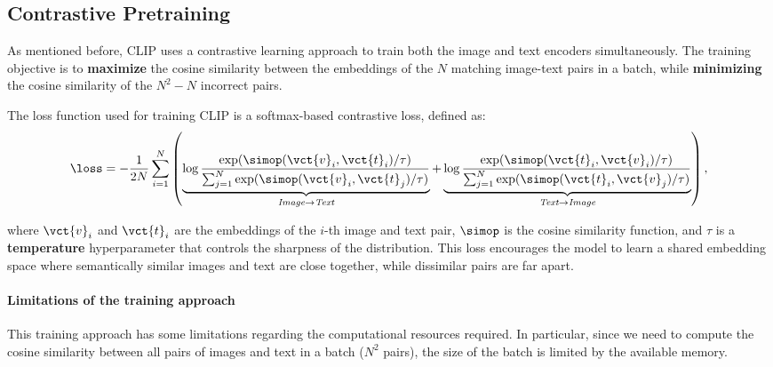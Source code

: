 \subsection{Contrastive Pretraining}
As mentioned before, CLIP uses a contrastive learning approach to train both the image and text encoders simultaneously.
The training objective is to \textbf{maximize} the cosine similarity between the embeddings of the $N$ matching 
image-text pairs in a batch, while \textbf{minimizing} the cosine similarity of the $N^2 - N$ incorrect pairs.

The loss function used for training CLIP is a softmax-based contrastive loss, defined as:
\begin{equation}
    \loss = -\frac{1}{2N} \sum_{i=1}^{N} \left(
    \underbrace{\log \frac{\exp(\simop(\vct{v}_i, \vct{t}_i) / \tau)}{\sum_{j=1}^{N} \exp(\simop(\vct{v}_i, \vct{t}_j) / \tau)}}_{\textit{Image} \to \textit{Text}}
    +
    \underbrace{\log \frac{\exp(\simop(\vct{t}_i, \vct{v}_i) / \tau)}{\sum_{j=1}^{N} \exp(\simop(\vct{t}_i, \vct{v}_j) / \tau)}}_{\textit{Text} \to \textit{Image}}\right),
\end{equation}

where $\vct{v}_i$ and $\vct{t}_i$ are the embeddings of the $i$-th image and text pair, $\simop$ is the cosine similarity function, and $\tau$ is a \textbf{temperature} hyperparameter that controls the sharpness of the distribution.
This loss encourages the model to learn a shared embedding space where semantically similar images and text are
close together, while dissimilar pairs are far apart.



\paragraph{Limitations of the training approach}
\label{CLIP:training-limitations}
This training approach has some limitations regarding the computational resources required. 
In particular, since we need to compute the cosine similarity between all pairs of images and text in a batch ($N^2$ pairs),
the size of the batch is limited by the available memory.

